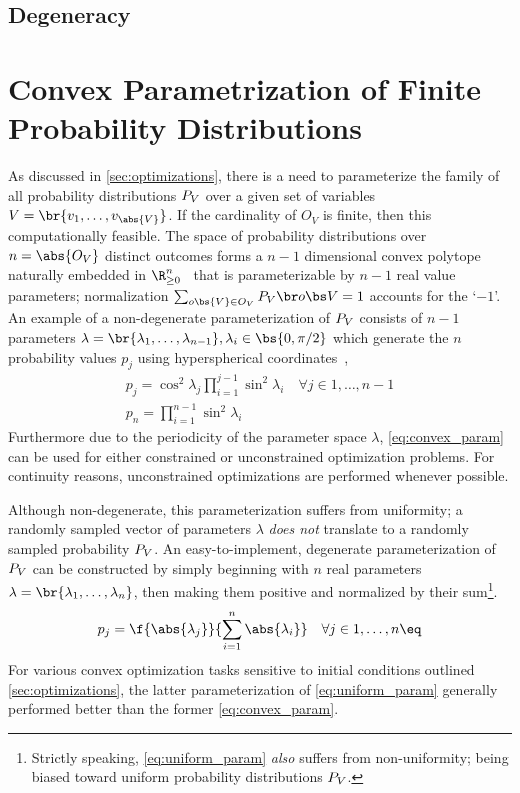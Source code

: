 \documentclass[aps, 10pt, english, twoside, pra, nofootinbib, longbibliography]{revtex4-1}
\begin{document}
    \subsection{Degeneracy}
    \section{Convex Parametrization of Finite Probability Distributions}
    As discussed in \cref{sec:optimizations}, there is a need to parameterize the family of all probability distributions $\prob[V]$ over a given set of variables $V = \br{v_1, \ldots, v_{\abs{V}}}$. If the cardinality of $O_{V}$ is finite, then this computationally feasible. The space of probability distributions over $n = \abs{O_{V}}$ distinct outcomes forms a $n-1$ dimensional convex polytope naturally embedded in $\R_{\geq 0}^n$~\cite{Brunner_2013} that is parameterizable by $n-1$ real value parameters; normalization $\sum_{o\bs{V} \in O_V} \prob[V][\outc{V}] = 1$ accounts for the `$-1$'. An example of a non-degenerate parameterization of $\prob[V]$ consists of $n-1$ parameters $\lambda = \br{\lambda_1, \ldots, \lambda_{n-1}}, \lambda_i \in \bs{0, \pi/2}$ which generate the $n$ probability values $p_j$ using hyperspherical coordinates~\cite{Hedemann_2013, Spengler_2010_Unitary},
    \begin{equation}
    \begin{gathered}
        \label{eq:convex_param}
        p_j = \cos^2 \lambda_j \prod_{i=1}^{j-1} \sin^2 \lambda_i \quad \forall j \in 1, \ldots, n - 1 \\
        p_n = \prod_{i=1}^{n-1} \sin^2 \lambda_i
    \end{gathered}
    \end{equation}
    Furthermore due to the periodicity of the parameter space $\lambda$, \cref{eq:convex_param} can be used for either constrained or unconstrained optimization problems. For continuity reasons, unconstrained optimizations are performed whenever possible.

    Although non-degenerate, this parameterization suffers from uniformity; a randomly sampled vector of parameters $\lambda$ \textit{does not} translate to a randomly sampled probability $\prob[V]$. An easy-to-implement, degenerate parameterization of $\prob[V]$ can be constructed by simply beginning with $n$ real parameters $\lambda = \br{\lambda_1, \ldots, \lambda_n}$, then making them positive and normalized by their sum\footnote{Strictly speaking, \cref{eq:uniform_param} \textit{also} suffers from non-uniformity; being biased toward uniform probability distributions $\prob[V]$. }.
    \[ p_j = \f{\abs{\lambda_j}}{\sum_{i=1}^{n} \abs{\lambda_i}} \quad \forall j \in 1, \ldots, n \eq \label{eq:uniform_param} \]
    For various convex optimization tasks sensitive to initial conditions outlined \cref{sec:optimizations}, the latter parameterization of \cref{eq:uniform_param} generally performed better than the former \cref{eq:convex_param}.

    
\end{document}
